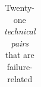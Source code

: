 \documentclass{sig-alternate}
\begin{document}
\begin{table}[t]
\begin{tabular}{cccc}
\bottomrule
\end{tabular}
\caption{Twenty-one \emph{technical pairs} that are failure-related}
\label{tab:badtechpairs}
\end{table}
\end{document}
